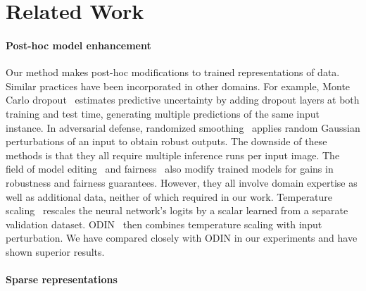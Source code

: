 \documentclass{article}
\begin{document}
\section{Related Work}

\paragraph{Post-hoc model enhancement} Our method makes post-hoc modifications to trained representations of data. Similar practices have been incorporated in other domains. For example, Monte Carlo dropout~\citep{gal2016dropout} estimates predictive uncertainty by adding dropout layers at both training and test time, generating multiple predictions of the same input instance. In adversarial defense, randomized smoothing~\citep{cohen2019certified} applies random Gaussian perturbations of an input to obtain robust outputs.
The downside of these methods is that they all require multiple inference runs per input image. The field of model editing~\citep{NEURIPS2021_c46489a2, Meng22GPT} and fairness~\citep{alabdulmohsin2021near, celis2019classification} also modify trained models for gains in robustness and fairness guarantees.
However, they all involve domain expertise as well as additional data, neither of which required in our work.
Temperature scaling~\citep{guo2017calibration} rescales the neural network's logits by a scalar learned from a separate validation dataset. ODIN~\citep{Liang2017} then combines temperature scaling with input perturbation. We have compared closely with ODIN in our experiments and have shown superior results.























\paragraph{Sparse representations}
\end{document}
